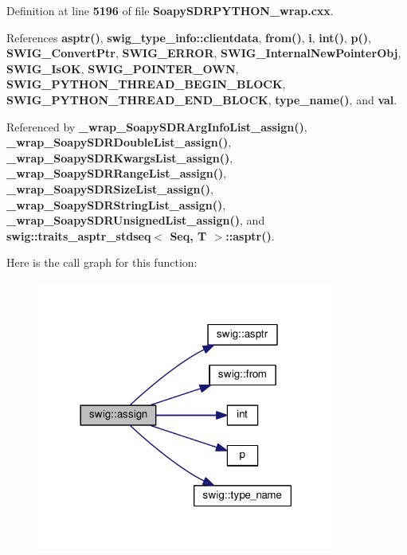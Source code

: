 Definition at line {\bf 5196} of file {\bf Soapy\+S\+D\+R\+P\+Y\+T\+H\+O\+N\+\_\+wrap.\+cxx}.



References {\bf asptr()}, {\bf swig\+\_\+type\+\_\+info\+::clientdata}, {\bf from()}, {\bf i}, {\bf int()}, {\bf p()}, {\bf S\+W\+I\+G\+\_\+\+Convert\+Ptr}, {\bf S\+W\+I\+G\+\_\+\+E\+R\+R\+OR}, {\bf S\+W\+I\+G\+\_\+\+Internal\+New\+Pointer\+Obj}, {\bf S\+W\+I\+G\+\_\+\+Is\+OK}, {\bf S\+W\+I\+G\+\_\+\+P\+O\+I\+N\+T\+E\+R\+\_\+\+O\+WN}, {\bf S\+W\+I\+G\+\_\+\+P\+Y\+T\+H\+O\+N\+\_\+\+T\+H\+R\+E\+A\+D\+\_\+\+B\+E\+G\+I\+N\+\_\+\+B\+L\+O\+CK}, {\bf S\+W\+I\+G\+\_\+\+P\+Y\+T\+H\+O\+N\+\_\+\+T\+H\+R\+E\+A\+D\+\_\+\+E\+N\+D\+\_\+\+B\+L\+O\+CK}, {\bf type\+\_\+name()}, and {\bf val}.



Referenced by {\bf \+\_\+wrap\+\_\+\+Soapy\+S\+D\+R\+Arg\+Info\+List\+\_\+assign()}, {\bf \+\_\+wrap\+\_\+\+Soapy\+S\+D\+R\+Double\+List\+\_\+assign()}, {\bf \+\_\+wrap\+\_\+\+Soapy\+S\+D\+R\+Kwargs\+List\+\_\+assign()}, {\bf \+\_\+wrap\+\_\+\+Soapy\+S\+D\+R\+Range\+List\+\_\+assign()}, {\bf \+\_\+wrap\+\_\+\+Soapy\+S\+D\+R\+Size\+List\+\_\+assign()}, {\bf \+\_\+wrap\+\_\+\+Soapy\+S\+D\+R\+String\+List\+\_\+assign()}, {\bf \+\_\+wrap\+\_\+\+Soapy\+S\+D\+R\+Unsigned\+List\+\_\+assign()}, and {\bf swig\+::traits\+\_\+asptr\+\_\+stdseq$<$ Seq, T $>$\+::asptr()}.



Here is the call graph for this function\+:
\nopagebreak
\begin{figure}[H]
\begin{center}
\leavevmode
\includegraphics[width=278pt]{d3/d99/namespaceswig_a2a372fe0bff2d95ccf819666e2074400_cgraph}
\end{center}
\end{figure}




